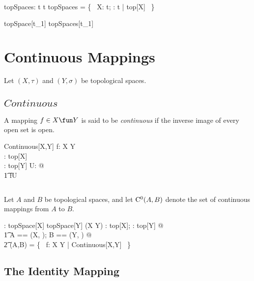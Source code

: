 \documentclass[11pt, oneside]{article}
\begin{document}
\begin{gendef}[t]
	topSpaces: \power t \rel \family t
\where
	topSpaces = \{~ X: \power t; \tau: \family t | \tau \in top[X] ~\}
\end{gendef}

\begin{remark}

\begin{zed}
	topSpace[t_1] \subseteq topSpaces[t_1]
\end{zed}

\end{remark}

\section{Continuous Mappings}

Let $(X,\tau)$ and $(Y,\sigma)$ be topological spaces.

\subsection{$Continuous$}

A mapping $f \in X \fun Y$ is said to be {\it continuous} if the inverse image of every open set is open.

\begin{schema}{Continuous}[X,Y]
	f: X \fun Y \\
	\tau: top[X] \\
	\sigma: top[Y]
\where
	\forall U: \sigma @ \\
	\t1	f\inv\limg U \rimg \in \tau
\end{schema}

\subsection{}

Let $A$ and $B$ be topological spaces, and
let $\operatorname{C^0}(A,B)$ denote the set of continuous mappings from $A$ to $B$.

\begin{gendef}[X,Y]
	\CzeroTT: topSpace[X] \cross topSpace[Y] \fun \power (X \fun Y)
\where
	\forall \tau: top[X]; \sigma: top[Y] @ \\
	\t1	\LET A == (X, \tau); B == (Y, \sigma) @ \\
	\t2		\CzeroTT(A,B) = \{~ f: X \fun Y | Continuous[X,Y] ~\}
\end{gendef}

\subsection{The Identity Mapping}
\end{document}
